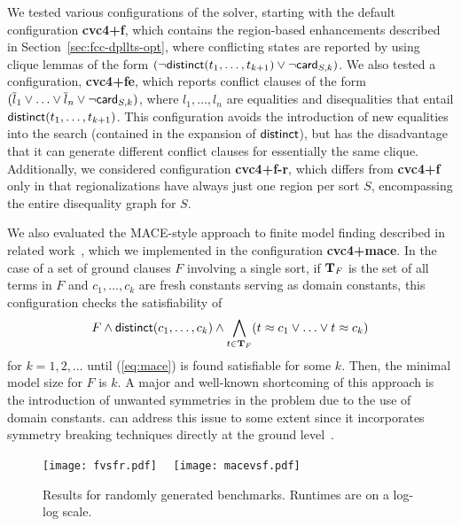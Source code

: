 \documentclass{svjour3}                     %
\begin{document}
We tested various configurations of the \fcc solver, 
starting with the default configuration {\bf cvc4+f}, 
which contains the region-based enhancements described 
in Section~\ref{sec:fcc-dpllts-opt},
where conflicting states are reported by using clique lemmas of the form 
$(\lnot \distinct( t_1, \ldots, t_{k+1} ) \lor \lnot \card[S,k])$.
We also tested a configuration, {\bf cvc4+fe}, which reports conflict clauses of the form $( \compl{l}_1 \vee \ldots \vee \compl{l}_n \vee \neg \card[S,k] )$,
where $l_1, \ldots, l_n$ are equalities and disequalities that entail $\distinct( t_1, \ldots, t_{k+1} )$.
This configuration avoids the introduction of new equalities into the search
(contained in the expansion of $\distinct$), 
but has the disadvantage that it can generate different conflict clauses
for essentially the same clique.
Additionally, we considered configuration {\bf cvc4+f-r}, 
which differs from {\bf cvc4+f} only in that regionalizations have always 
just one region per sort $S$, encompassing the entire disequality graph for $S$.

We also evaluated the MACE-style approach to finite model finding described in related work~\cite{mccune-1994},
which we implemented in the configuration {\bf cvc4+mace}.
In the case of a set of ground clauses $F$ involving a single sort, 
if $\terms_F$ is the set of all terms in $F$ and 
$c_1, \ldots, c_k$ are fresh constants serving as domain constants,
this configuration checks the satisfiability of 
\begin{equation}
\label{eq:mace}
 F \land \distinct(c_1, \ldots, c_k) \land 
 \displaystyle\bigwedge\limits_{t \in \terms_F} 
   (t \teq c_1 \lor \ldots \lor t \teq c_k )
\end{equation}
for $k = 1, 2, \ldots$ until (\ref{eq:mace}) is found satisfiable for some $k$.
Then, the minimal model size for $F$ is $k$.
A major and well-known shortcoming of this approach is 
the introduction of unwanted symmetries in the problem due to the use of domain constants.
\cvc can address this issue to some extent since it incorporates 
symmetry breaking techniques directly at the ground \euf level~\cite{DehEtAl-CADE-11}.

\begin{figure}[t]
\centering
\texttt{[image: fvsfr.pdf]} \ \  
\texttt{[image: macevsf.pdf]}
\caption[Results for randomly generated benchmarks]{Results for randomly generated benchmarks.
Runtimes are on a log-log scale.
}
\label{fig:results-random}
\end{figure}
\end{document}
